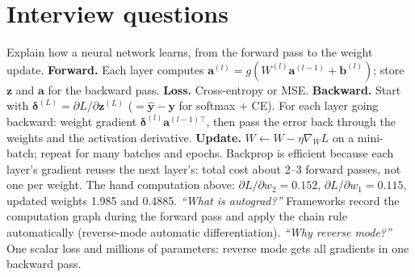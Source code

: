 \section{Interview questions}

\begin{qa}{ Explain how a neural network learns, from the forward pass to the weight update.}
\why
\textbf{Forward.} Each layer computes $\mathbf a^{(l)} = g(W^{(l)}\mathbf a^{(l-1)} + \mathbf b^{(l)})$; store $\mathbf z$ and $\mathbf a$ for the backward pass.
\textbf{Loss.} Cross-entropy or MSE.
\textbf{Backward.} Start with $\boldsymbol\delta^{(L)} = \partial L/\partial\mathbf z^{(L)}$ ($=\hat{\mathbf y} - \mathbf y$ for softmax + CE). For each layer going backward:
weight gradient $\boldsymbol\delta^{(l)}\mathbf a^{(l-1)\top}$, then pass the error back through the weights and the activation derivative.
\textbf{Update.} $W\leftarrow W - \eta\nabla_W L$ on a mini-batch; repeat for many batches and epochs.
Backprop is efficient because each layer's gradient reuses the next layer's: total cost about 2--3 forward passes, not one per weight.
\worked The hand computation above: $\partial L/\partial w_2 = 0.152$, $\partial L/\partial w_1 = 0.115$, updated weights 1.985 and 0.4885.
\pushes \emph{``What is autograd?''} Frameworks record the computation graph during the forward pass and apply the chain rule automatically (reverse-mode
automatic differentiation). \emph{``Why reverse mode?''} One scalar loss and millions of parameters: reverse mode gets all gradients in one backward pass.
\end{qa}


